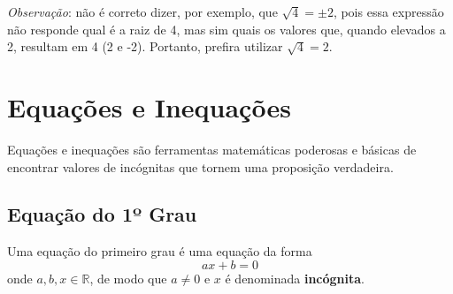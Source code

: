 \documentclass[13pt,letterpaper]{article}
\begin{document}
\emph{Observação}: não é correto dizer, por exemplo, que $\sqrt{4} = \pm 2$, pois essa expressão não responde qual é a raiz de 4, mas sim quais os valores que, quando elevados a 2, resultam em 4 (2 e -2).  Portanto, prefira utilizar $\sqrt{4} = 2$.
\newpage

\section{Equações e Inequações}
Equações e inequações são ferramentas matemáticas poderosas e básicas de encontrar valores de incógnitas que tornem uma proposição verdadeira. 

\subsection{Equação do 1º Grau}
Uma equação do primeiro grau é uma equação da forma
\begin{displaymath}
    ax + b = 0
\end{displaymath}
onde $a, b, x  \in \mathbb{R}$, de modo que $a \ne 0$ e $x$ é denominada \textbf{incógnita}.
\end{document}
